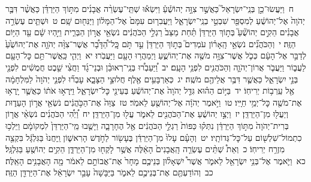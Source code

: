 \documentclass[18pt]{article}
\newcommand{\vart}[1]{\Bfootnote{#1}}	%
\newcommand{\kri}[1]{\Afootnote{#1}}	%
\begin{document}
 {\loc ח~}וַיַּעֲשׂוּ־כֵ֣ן בְּנֵֽי־יִשְׂרָאֵל֮ כַּאֲשֶׁ֣ר צִוָּ֣ה יְהוֹשֻׁ֒עַ֒ וַיִּשְׂא֡וּ שְׁתֵּֽי־עֶשְׂרֵ֨ה אֲבָנִ֜ים מִתּ֣וֹךְ הַיַּרְדֵּ֗ן כַּאֲשֶׁ֨ר דִּבֶּ֤ר יְהֹוָה֙ אֶל־יְהוֹשֻׁ֔עַ לְמִסְפַּ֖ר שִׁבְטֵ֣י בְנֵֽי־יִשְׂרָאֵ֑ל וַיַּעֲבִר֤וּם עִמָּם֙ אֶל־הַמָּל֔וֹן וַיַּנִּח֖וּם שָֽׁם׃ \startlock
 {\loc ט~}וּשְׁתֵּ֧ים עֶשְׂרֵ֣ה אֲבָנִ֗ים הֵקִ֣ים יְהוֹשֻׁ֘עַ֮ בְּת֣וֹךְ הַיַּרְדֵּן֒ תַּ֗חַת מַצַּב֙ רַגְלֵ֣י הַכֹּהֲנִ֔ים נֹשְׂאֵ֖י אֲר֣וֹן הַבְּרִ֑ית וַיִּ֣הְיוּ שָׁ֔ם עַ֖ד הַיּ֥וֹם הַזֶּֽה׃ \startlock
 {\loc י~}וְהַכֹּהֲנִ֞ים נֹשְׂאֵ֣י הָֽאָר֗וֹן עֹמְדִים֮ בְּת֣וֹךְ הַיַּרְדֵּן֒ עַ֣ד תֹּ֣ם כׇּֽל־הַ֠דָּבָ֠ר אֲשֶׁר־צִוָּ֨ה יְהֹוָ֤ה אֶת־יְהוֹשֻׁ֙עַ֙ לְדַבֵּ֣ר אֶל־הָעָ֔ם כְּכֹ֛ל אֲשֶׁר־צִוָּ֥ה מֹשֶׁ֖ה אֶת־יְהוֹשֻׁ֑עַ וַיְמַהֲר֥וּ הָעָ֖ם וַיַּעֲבֹֽרוּ׃ \startlock
 {\loc יא~}וַיְהִ֛י כַּֽאֲשֶׁר־תַּ֥ם כׇּל־הָעָ֖ם לַעֲב֑וֹר וַיַּעֲבֹ֧ר אֲרוֹן־יְהֹוָ֛ה וְהַכֹּהֲנִ֖ים לִפְנֵ֥י הָעָֽם׃ \startlock
 {\loc יב~}וַ֠יַּעַבְר֠וּ בְּנֵֽי־רְאוּבֵ֨ן וּבְנֵי־גָ֜ד וַחֲצִ֨י שֵׁ֤בֶט  \edtext{הַֽמְנַשֶּׁה֙}{\vart{א=הַֽמֲנַשֶּׁה֙ | }}  חֲמֻשִׁ֔ים לִפְנֵ֖י בְּנֵ֣י יִשְׂרָאֵ֑ל כַּאֲשֶׁ֛ר דִּבֶּ֥ר אֲלֵיהֶ֖ם מֹשֶֽׁה׃ \startlock
 {\loc יג~}כְּאַרְבָּעִ֥ים אֶ֖לֶף חֲלוּצֵ֣י הַצָּבָ֑א עָבְר֞וּ לִפְנֵ֤י יְהֹוָה֙ לַמִּלְחָמָ֔ה אֶ֖ל עַֽרְב֥וֹת יְרִיחֽוֹ׃ \startlock
 {\loc יד~}בַּיּ֣וֹם הַה֗וּא גִּדַּ֤ל יְהֹוָה֙ אֶת־יְהוֹשֻׁ֔עַ בְּעֵינֵ֖י כׇּל־יִשְׂרָאֵ֑ל וַיִּֽרְא֣וּ אֹת֔וֹ כַּאֲשֶׁ֛ר יָֽרְא֥וּ אֶת־מֹשֶׁ֖ה כׇּל־יְמֵ֥י חַיָּֽיו׃ \startlock
 {\loc טו~}וַיֹּ֣אמֶר יְהֹוָ֔ה אֶל־יְהוֹשֻׁ֖עַ לֵאמֹֽר׃ \startlock
 {\loc טז~}צַוֵּה֙ אֶת־הַכֹּ֣הֲנִ֔ים נֹשְׂאֵ֖י אֲר֣וֹן הָעֵד֑וּת וְיַעֲל֖וּ מִן־הַיַּרְדֵּֽן׃ \startlock
 {\loc יז~}וַיְצַ֣ו יְהוֹשֻׁ֔עַ אֶת־הַכֹּהֲנִ֖ים לֵאמֹ֑ר עֲל֖וּ מִן־הַיַּרְדֵּֽן׃ \startlock
 {\loc יח~}וַ֠יְהִ֠י  \edtext{(בעלות)}{\kri{קרי: כַּעֲל֨וֹת}}  הַכֹּהֲנִ֜ים נֹשְׂאֵ֨י אֲר֤וֹן בְּרִית־יְהֹוָה֙ מִתּ֣וֹךְ הַיַּרְדֵּ֔ן נִתְּק֗וּ כַּפּוֹת֙ רַגְלֵ֣י הַכֹּהֲנִ֔ים אֶ֖ל הֶחָרָבָ֑ה וַיָּשֻׁ֤בוּ מֵֽי־הַיַּרְדֵּן֙ לִמְקוֹמָ֔ם וַיֵּלְכ֥וּ כִתְמוֹל־שִׁלְשׁ֖וֹם עַל־כׇּל־גְּדוֹתָֽיו׃ \startlock
 {\loc יט~}וְהָעָ֗ם עָלוּ֙ מִן־הַיַּרְדֵּ֔ן בֶּעָשׂ֖וֹר לַחֹ֣דֶשׁ הָרִאשׁ֑וֹן וַֽיַּחֲנוּ֙ בַּגִּלְגָּ֔ל בִּקְצֵ֖ה מִזְרַ֥ח יְרִיחֽוֹ׃ \startlock
 {\loc כ~}וְאֵת֩ שְׁתֵּ֨ים עֶשְׂרֵ֤ה הָֽאֲבָנִים֙ הָאֵ֔לֶּה אֲשֶׁ֥ר לָקְח֖וּ מִן־הַיַּרְדֵּ֑ן הֵקִ֥ים יְהוֹשֻׁ֖עַ בַּגִּלְגָּֽל׃ \startlock
 {\loc כא~}וַיֹּ֛אמֶר אֶל־בְּנֵ֥י יִשְׂרָאֵ֖ל לֵאמֹ֑ר אֲשֶׁר֩ יִשְׁאָל֨וּן בְּנֵיכֶ֤ם מָחָר֙ אֶת־אֲבוֹתָ֣ם לֵאמֹ֔ר מָ֖ה הָאֲבָנִ֥ים הָאֵֽלֶּה׃ \startlock
 {\loc כב~}וְהוֹדַעְתֶּ֖ם אֶת־בְּנֵיכֶ֣ם לֵאמֹ֑ר בַּיַּבָּשָׁה֙ עָבַ֣ר יִשְׂרָאֵ֔ל אֶת־הַיַּרְדֵּ֖ן הַזֶּֽה׃ \startlock
\end{document}
